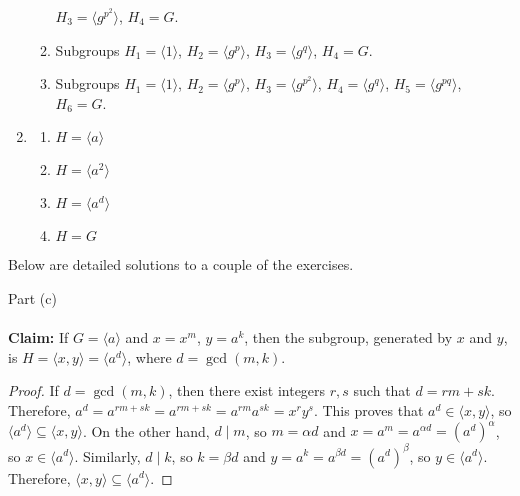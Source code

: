 \documentclass[12pt]{article}
\newcommand{\divides}{\ensuremath{\mid}}
\newcommand{\<}{\ensuremath{\langle}}
\renewcommand{\>}{\ensuremath{\rangle}}
\theoremstyle{plain}
\theoremstyle{definition}
\begin{document}
\begin{enumerate}
\begin{enumerate}
$H_3=\langle g^{p^2}\rangle$, $H_4=G$.
\item Subgroups $H_1=\langle 1\rangle$, $H_2=\langle g^p\rangle$,
$H_3=\langle g^{q}\rangle$, $H_4=G$.
\item Subgroups 
$H_1=\langle 1\rangle$, $H_2=\langle g^p\rangle$,
$H_3=\langle g^{p^2}\rangle$, $H_4=\langle g^q\rangle$, 
$H_5=\langle g^{pq}\rangle$,  $H_6=G$.
\end{enumerate}
\item \label{item:1}
\begin{enumerate}
\item $H=\langle a\rangle$
\item $H=\langle a^2\rangle$
\item $H=\langle a^d\rangle$
\item $H=G$
\end{enumerate}
\end{enumerate}

\newpage

\pagestyle{fancy} \lhead{\bf } 
\rhead{} \lfoot{} \cfoot{\thepage} \rfoot{}

\noindent Below are detailed solutions to a couple of the exercises.

\medskip

 Part (c)\\
\\
{\bf Claim:}
If $G = \<a\>$ and $x = x^m$, $y = a^k$, then the subgroup, 
generated by $x$ and $y$, is 
$H = \<x, y\> = \<a^d\>$, where $d = \gcd(m, k)$.
\begin{proof}
If $d = \gcd(m, k)$, then there exist integers $r, s$ such that 
$d = rm + sk$.  Therefore, 
$a^d = a^{rm + sk} = a^{rm + sk} = a^{rm}a^{sk} =  x^ry^s$. This proves that
$a^d \in \<x, y\>$, so 
$\<a^d\> \subseteq \<x, y\>$. On the other hand, 
$d\divides m$, so
$m = \alpha d$ and $x = a^m = a^{\alpha d} = (a^d)^\alpha$, so 
$x\in \<a^d\>$.  
Similarly, $d\divides k$, so $k = \beta d$ 
and $y = a^k = a^{\beta d} = (a^d)^\beta$, so
$y\in \<a^d\>$.  Therefore, $\<x, y\> \subseteq \<a^d\>$.
\end{proof}
\end{document}
